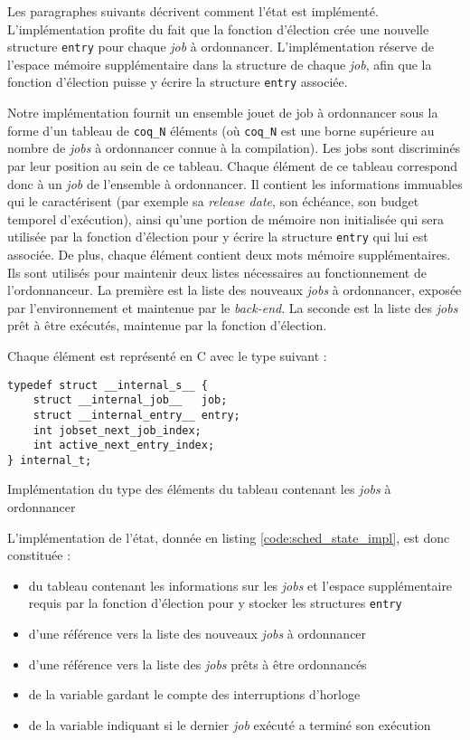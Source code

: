 	Les paragraphes suivants décrivent comment l'état est implémenté.
	L'implémentation profite du fait que la fonction d'élection crée une nouvelle structure \texttt{entry} pour chaque \emph{job} à ordonnancer. L'implémentation réserve de l'espace mémoire supplémentaire dans la structure de chaque \emph{job}, afin que la fonction d'élection puisse y écrire la structure \texttt{entry} associée.

	Notre implémentation fournit un ensemble jouet de job à ordonnancer sous la forme d'un tableau de \texttt{coq\_N} éléments (où \texttt{coq\_N} est une borne supérieure au nombre de \emph{jobs} à ordonnancer connue à la compilation). Les jobs sont discriminés par leur position au sein de ce tableau. Chaque élément de ce tableau correspond donc à un \emph{job} de l'ensemble à ordonnancer. Il contient les informations immuables qui le caractérisent (par exemple sa \emph{release date}, son échéance, son budget temporel d'exécution), ainsi qu'une portion de mémoire non initialisée qui sera utilisée par la fonction d'élection pour y écrire la structure \texttt{entry} qui lui est associée. De plus, chaque élément contient deux mots mémoire supplémentaires. Ils sont utilisés pour maintenir deux listes nécessaires au fonctionnement de l'ordonnanceur. La première est la liste des nouveaux \emph{jobs} à ordonnancer, exposée par l'environnement et maintenue par le \emph{back-end}. La seconde est la liste des \emph{jobs} prêt à être exécutés, maintenue par la fonction d'élection.

	Chaque élément est représenté en C avec le type suivant :
	\begin{listing}[!hb]
	\begin{verbatim}
typedef struct __internal_s__ {
    struct __internal_job__   job;
    struct __internal_entry__ entry;
    int jobset_next_job_index;
    int active_next_entry_index;
} internal_t;
	\end{verbatim}
	\caption{Implémentation du type des éléments du tableau contenant les \emph{jobs} à ordonnancer}
	\label{code:array_elem_impl}
	\end{listing}

	L'implémentation de l'état, donnée en listing \ref{code:sched_state_impl}, est donc constituée :
	\begin{itemize}
		\item du tableau contenant les informations sur les \emph{jobs} et l'espace supplémentaire requis par la fonction d'élection pour y stocker les structures \texttt{entry}
		\item d'une référence vers la liste des nouveaux \emph{jobs} à ordonnancer
		\item d'une référence vers la liste des \emph{jobs} prêts à être ordonnancés
		\item de la variable gardant le compte des interruptions d'horloge
		\item de la variable indiquant si le dernier \emph{job} exécuté a terminé son exécution
	\end{itemize}

